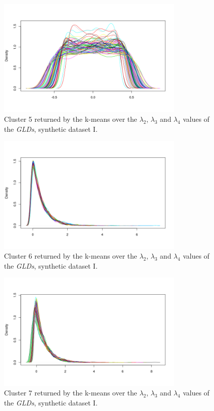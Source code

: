 \begin{figure}[H]
    \centering
    \includegraphics[width=0.8\textwidth]{img/gld_clustering/Dataset1/l2_l3_l4/cluster7.png}
    \caption{Cluster 5 returned by the k-means over the $\lambda_{2}$, $\lambda_{3}$ and $\lambda_{4}$ values of the \textit{GLDs}, synthetic dataset I.}
    \label{fig:dataset1_l2l3l4_cl5}
\end{figure}

\begin{figure}[H]
    \centering
    \includegraphics[width=0.8\textwidth]{img/gld_clustering/Dataset1/l2_l3_l4/intento_3/cluster6.png}
    \caption{Cluster 6 returned by the k-means over the $\lambda_{2}$, $\lambda_{3}$ and $\lambda_{4}$ values of the \textit{GLDs}, synthetic dataset I.}
    \label{fig:dataset1_l2l3l4_cl6}
\end{figure}

\begin{figure}[H]
    \centering
    \includegraphics[width=0.8\textwidth]{img/gld_clustering/Dataset1/l2_l3_l4/intento_3/cluster7.png}
    \caption{Cluster 7 returned by the k-means over the $\lambda_{2}$, $\lambda_{3}$ and $\lambda_{4}$ values of the \textit{GLDs}, synthetic dataset I.}
    \label{fig:dataset1_l2l3l4_cl7}
\end{figure}

